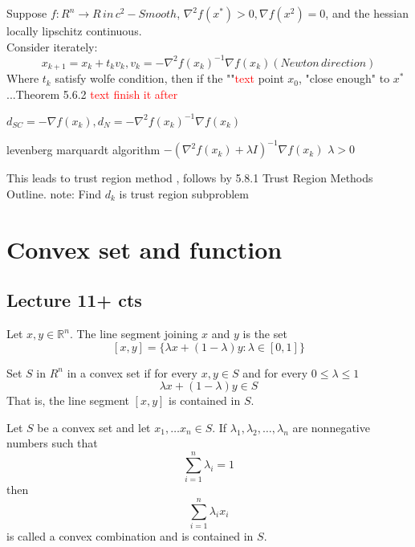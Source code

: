 \begin{theorem}
    Suppose $f:R^n\to R\,in\, c^2-Smooth$, $\nabla^2f(x^*)>0,\nabla f(x^2)=0$, and 
    the hessian locally lipschitz continuous.\\
    Consider iterately:
    $$x_{k+1}=x_k+t_kv_k,v_k=-\nabla^2f(x_k)^{-1}\nabla f(x_k)(Newton\,direction)$$
    Where $t_k$ satisfy wolfe condition, then  if the ""\textcolor{red}{text} point $x_0$,
    "close enough" to $x^*$ ...Theorem 5.6.2 \textcolor{red}{text finish it after}
\end{theorem}
\begin{problem}
    $d_{SC}=-\nabla f(x_k),d_N=-\nabla^2f(x_k)^{-1}\nabla f(x_k) $
\end{problem}

    levenberg marquardt algorithm
$-(\nabla^2 f(x_k)+\lambda I)^{-1}\nabla f(x_k)$ $\lambda >0$
\begin{problem}
    This leads to trust region method ,
    follows by 5.8.1 Trust Region Methods Outline.
    note: Find $d_k$ is trust region subproblem
\end{problem}


\section{Convex set and function}
\subsection{Lecture 11+ cts}
\begin{definition}
    Let $x,y \in \mathbb R^n$. The line segment joining $x$ and $y$ is the set
    $$[x,y] = \{\lambda x + (1 - \lambda)y : \lambda \in [0,1]\}$$
\end{definition}

\begin{definition}
    Set $S$ in $R^n$ in a convex set if for every $x, y \in S$ and for every  $0\leq \lambda \leq 1$ $$\lambda x+(1-\lambda)y\in S$$
    That is, the line segment $[x,y]$ is contained in $S$.
\end{definition}
\begin{definition}
    Let $S$ be a convex set and let $x_1,\ldots x_n \in S$. If $\lambda_1,\lambda_2,\ldots,\lambda_n$ are nonnegative numbers such that $$\sum_{i=1}^{n} \lambda_i = 1$$ then $$\sum^n_{i=1} \lambda_i x_i$$ is called a convex combination and is contained in $S$.
\end{definition}

